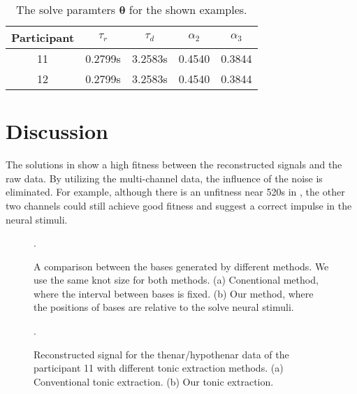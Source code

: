 \documentclass[10pt,conference]{ieeeconf}
\begin{document}
\begin{table}[h] 
  \centering
  \caption{The solve paramters $\boldsymbol{\theta}$ for the shown examples.} \label{tab:theta}
  \begin{tabular}{|c|c|c|c|c|}
    \hline
    Participant & $\tau_r$ & $\tau_d$ & $\alpha_{2}$ & $\alpha_{3}$ \\
    \hline
    11 & 0.2799s & 3.2583s & 0.4540 & 0.3844\\ \hline
    12 & 0.2799s & 3.2583s & 0.4540 & 0.3844\\
    \hline
  \end{tabular}
\end{table}

\section{Discussion}

The solutions in  show a high fitness between the reconstructed signals and the raw data. By utilizing the multi-channel data, the influence of the noise is eliminated. For example, although there is an unfitness near 520s in , the other two channels could still achieve good fitness and suggest a correct impulse in the neural stimuli.

\begin{figure*}[!tb]
  \centering
  \DeclareGraphicsExtensions.
  \caption{A comparison between the bases generated by different methods. We use the same knot size for both methods. (a) Conentional method, where the interval between bases is fixed. (b) Our method, where the positions of bases are relative to the solve neural stimuli.} \label{fig:bases}
\end{figure*}

\begin{figure*}[!tb]
  \centering
  \DeclareGraphicsExtensions.
  \caption{Reconstructed signal for the thenar/hypothenar data of the participant 11 with different tonic extraction methods. (a) Conventional tonic extraction. (b) Our tonic extraction.} \label{fig:comptonic}
\end{figure*}
\end{document}
